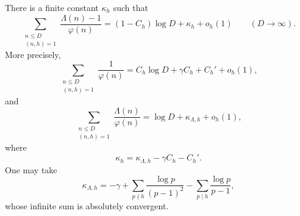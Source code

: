 \begin{lemma}
\label{lem:residual-coefficient-average}
There is a finite constant $\kappa_h$ such that
\begin{equation}\label{eq:residual-coefficient-average}
 \sum_{\substack{n\leq D\\(n,h)=1}}
 \frac{\Lambda(n)-1}{\varphi(n)}
 =(1-C_h)\log D+\kappa_h+o_h(1)
 \qquad(D\to\infty).
\end{equation}
More precisely,
\begin{equation}\label{eq:reciprocal-phi-average}
 \sum_{\substack{n\leq D\\(n,h)=1}}\frac1{\varphi(n)}
 =C_h\log D+\gamma C_h+C_h'+o_h(1),
\end{equation}
and
\begin{equation}\label{eq:Lambda-over-phi-average}
 \sum_{\substack{n\leq D\\(n,h)=1}}
 \frac{\Lambda(n)}{\varphi(n)}
 =\log D+\kappa_{\Lambda,h}+o_h(1),
\end{equation}
where
\begin{equation}\label{eq:kappa-h-definition}
 \kappa_h=\kappa_{\Lambda,h}-\gamma C_h-C_h'.
\end{equation}
One may take
\begin{equation}\label{eq:kappa-Lambda-explicit}
 \kappa_{\Lambda,h}
 =-\gamma
  +\sum_{p\nmid h}\frac{\log p}{(p-1)^2}
  -\sum_{p\mid h}\frac{\log p}{p-1},
\end{equation}
whose infinite sum is absolutely convergent.
\end{lemma}

